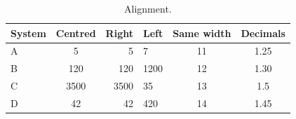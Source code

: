 \documentclass{article}
\begin{document}
\begin{table}[h]\centering\caption{Alignment.}
\begin{tabular}{lcrlcc}
\toprule
System & Centred & Right & Left & Same width & Decimals \\
\midrule
A & 5 & 5 & 7 & 11 & 1.25 \\
B & 120 & 120 & 1200 & 12 & 1.30 \\
C & 3500 & 3500 & 35 & 13 & 1.5 \\
D & 42 & 42 & 420 & 14 & 1.45 \\
\bottomrule
\end{tabular}\end{table}
\end{document}
